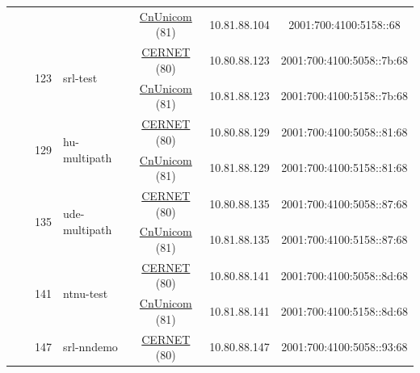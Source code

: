 \begin{small}
\begin{center}
\begin{longtable}{|c|c|c|c|c|c|c|c|}
  &  & \multicolumn{2}{|c|}{} & \multicolumn{2}{|c|}{\tiny{\href{http://www.chinaunicom.com}{CnUnicom} (81)}} & \tiny{10.81.88.104} & \tiny{2001:700:4100:5158::68} \\* \cline{3-3}\cline{4-4}\cline{5-5}\cline{6-6}\cline{7-7}\cline{8-8}
  &  & \multirow{2}{*}{\tiny{123}} & \multicolumn{1}{|l|}{\multirow{2}{*}{\tiny{srl-test}}} & \multicolumn{2}{|c|}{\tiny{\href{http://www.cernet.edu.cn}{CERNET} (80)}} & \tiny{10.80.88.123} & \tiny{2001:700:4100:5058::7b:68} \\* \cline{5-5}\cline{6-6}\cline{7-7}\cline{8-8}
  &  &  &  & \multicolumn{2}{|c|}{\tiny{\href{http://www.chinaunicom.com}{CnUnicom} (81)}} & \tiny{10.81.88.123} & \tiny{2001:700:4100:5158::7b:68} \\* \cline{3-3}\cline{4-4}\cline{5-5}\cline{6-6}\cline{7-7}\cline{8-8}
  &  & \multirow{2}{*}{\tiny{129}} & \multicolumn{1}{|l|}{\multirow{2}{*}{\tiny{hu-multipath}}} & \multicolumn{2}{|c|}{\tiny{\href{http://www.cernet.edu.cn}{CERNET} (80)}} & \tiny{10.80.88.129} & \tiny{2001:700:4100:5058::81:68} \\* \cline{5-5}\cline{6-6}\cline{7-7}\cline{8-8}
  &  &  &  & \multicolumn{2}{|c|}{\tiny{\href{http://www.chinaunicom.com}{CnUnicom} (81)}} & \tiny{10.81.88.129} & \tiny{2001:700:4100:5158::81:68} \\* \cline{3-3}\cline{4-4}\cline{5-5}\cline{6-6}\cline{7-7}\cline{8-8}
  &  & \multirow{2}{*}{\tiny{135}} & \multicolumn{1}{|l|}{\multirow{2}{*}{\tiny{ude-multipath}}} & \multicolumn{2}{|c|}{\tiny{\href{http://www.cernet.edu.cn}{CERNET} (80)}} & \tiny{10.80.88.135} & \tiny{2001:700:4100:5058::87:68} \\* \cline{5-5}\cline{6-6}\cline{7-7}\cline{8-8}
  &  &  &  & \multicolumn{2}{|c|}{\tiny{\href{http://www.chinaunicom.com}{CnUnicom} (81)}} & \tiny{10.81.88.135} & \tiny{2001:700:4100:5158::87:68} \\* \cline{3-3}\cline{4-4}\cline{5-5}\cline{6-6}\cline{7-7}\cline{8-8}
  &  & \multirow{2}{*}{\tiny{141}} & \multicolumn{1}{|l|}{\multirow{2}{*}{\tiny{ntnu-test}}} & \multicolumn{2}{|c|}{\tiny{\href{http://www.cernet.edu.cn}{CERNET} (80)}} & \tiny{10.80.88.141} & \tiny{2001:700:4100:5058::8d:68} \\* \cline{5-5}\cline{6-6}\cline{7-7}\cline{8-8}
  &  &  &  & \multicolumn{2}{|c|}{\tiny{\href{http://www.chinaunicom.com}{CnUnicom} (81)}} & \tiny{10.81.88.141} & \tiny{2001:700:4100:5158::8d:68} \\* \cline{3-3}\cline{4-4}\cline{5-5}\cline{6-6}\cline{7-7}\cline{8-8}
  &  & \multirow{2}{*}{\tiny{147}} & \multicolumn{1}{|l|}{\multirow{2}{*}{\tiny{srl-nndemo}}} & \multicolumn{2}{|c|}{\tiny{\href{http://www.cernet.edu.cn}{CERNET} (80)}} & \tiny{10.80.88.147} & \tiny{2001:700:4100:5058::93:68} \\* \cline{5-5}\cline{6-6}\cline{7-7}\cline{8-8}

\end{longtable}
\end{center}
\end{small}
